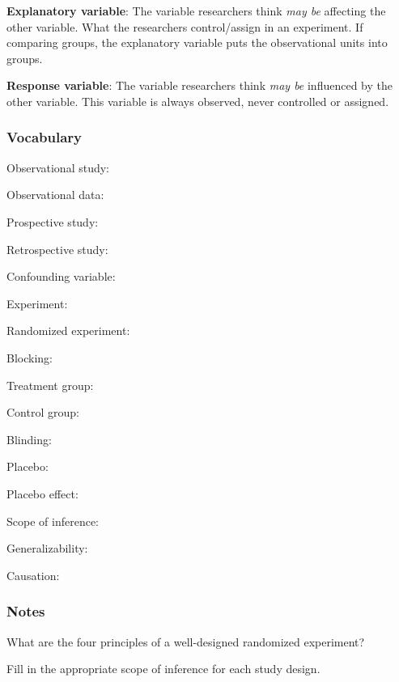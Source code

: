 \documentclass[
]{report}
\newcommand{\rgs}{\vspace{12pt}} %
\newcommand{\rgi}{\hspace{24pt}}  %
\begin{document}
\textbf{Explanatory variable}: The variable researchers think \emph{may be} affecting the other variable. What the researchers control/assign in an experiment. If comparing groups, the explanatory variable puts the observational units into groups.

\textbf{Response variable}: The variable researchers think \emph{may be} influenced by the other variable. This variable is always observed, never controlled or assigned.

\hypertarget{vocabulary-2}{%
\subsubsection*{Vocabulary}\label{vocabulary-2}}

Observational study:
\rgs

\rgi Observational data:
\rgs

\rgi Prospective study:
\rgs

\rgi Retrospective study:
\rgs

Confounding variable:
\rgs

Experiment:
\rgs

\rgi Randomized experiment:
\rgs

\rgi Blocking:
\rgs

\rgi Treatment group:
\rgs

\rgi Control group:
\rgs

\rgi Blinding:
\rgs

\rgi Placebo:
\rgs

\rgi Placebo effect:
\rgs

Scope of inference:
\rgs

\rgi Generalizability:
\rgs

\rgi Causation:
\rgs

\hypertarget{notes-2}{%
\subsubsection*{Notes}\label{notes-2}}

What are the four principles of a well-designed randomized experiment?\\
\rgs
\rgs
\rgs

Fill in the appropriate scope of inference for each study design.
\end{document}
